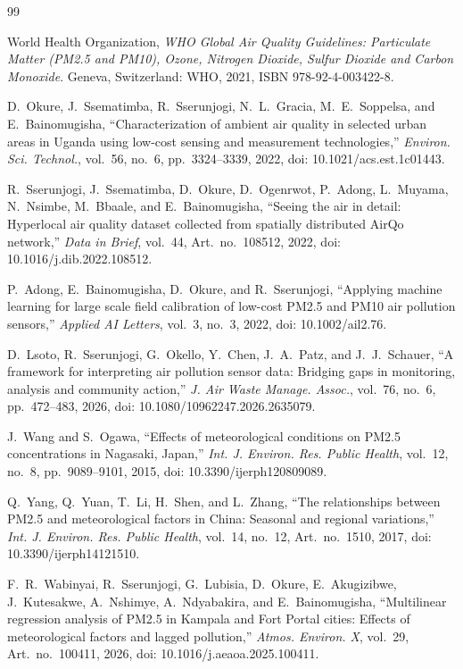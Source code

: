\documentclass{ieeeaccess}
\begin{document}
\begin{thebibliography}{99}

World Health Organization, \emph{WHO Global Air Quality Guidelines: Particulate Matter (PM2.5 and PM10), Ozone, Nitrogen Dioxide, Sulfur Dioxide and Carbon Monoxide}. Geneva, Switzerland: WHO, 2021, ISBN 978-92-4-003422-8.

D.~Okure, J.~Ssematimba, R.~Sserunjogi, N.~L.~Gracia, M.~E.~Soppelsa, and E.~Bainomugisha, ``Characterization of ambient air quality in selected urban areas in Uganda using low-cost sensing and measurement technologies,'' \emph{Environ. Sci. Technol.}, vol.~56, no.~6, pp.~3324--3339, 2022, doi: 10.1021/acs.est.1c01443.

R.~Sserunjogi, J.~Ssematimba, D.~Okure, D.~Ogenrwot, P.~Adong, L.~Muyama, N.~Nsimbe, M.~Bbaale, and E.~Bainomugisha, ``Seeing the air in detail: Hyperlocal air quality dataset collected from spatially distributed AirQo network,'' \emph{Data in Brief}, vol.~44, Art.~no.~108512, 2022, doi: 10.1016/j.dib.2022.108512.

P.~Adong, E.~Bainomugisha, D.~Okure, and R.~Sserunjogi, ``Applying machine learning for large scale field calibration of low-cost PM2.5 and PM10 air pollution sensors,'' \emph{Applied AI Letters}, vol.~3, no.~3, 2022, doi: 10.1002/ail2.76.

D.~Lsoto, R.~Sserunjogi, G.~Okello, Y.~Chen, J.~A.~Patz, and J.~J.~Schauer, ``A framework for interpreting air pollution sensor data: Bridging gaps in monitoring, analysis and community action,'' \emph{J. Air Waste Manage. Assoc.}, vol.~76, no.~6, pp.~472--483, 2026, doi: 10.1080/10962247.2026.2635079.

J.~Wang and S.~Ogawa, ``Effects of meteorological conditions on PM2.5 concentrations in Nagasaki, Japan,'' \emph{Int. J. Environ. Res. Public Health}, vol.~12, no.~8, pp.~9089--9101, 2015, doi: 10.3390/ijerph120809089.

Q.~Yang, Q.~Yuan, T.~Li, H.~Shen, and L.~Zhang, ``The relationships between PM2.5 and meteorological factors in China: Seasonal and regional variations,'' \emph{Int. J. Environ. Res. Public Health}, vol.~14, no.~12, Art.~no.~1510, 2017, doi: 10.3390/ijerph14121510.

F.~R.~Wabinyai, R.~Sserunjogi, G.~Lubisia, D.~Okure, E.~Akugizibwe, J.~Kutesakwe, A.~Nshimye, A.~Ndyabakira, and E.~Bainomugisha, ``Multilinear regression analysis of PM2.5 in Kampala and Fort Portal cities: Effects of meteorological factors and lagged pollution,'' \emph{Atmos. Environ. X}, vol.~29, Art.~no.~100411, 2026, doi: 10.1016/j.aeaoa.2025.100411.


\end{thebibliography}
\end{document}
